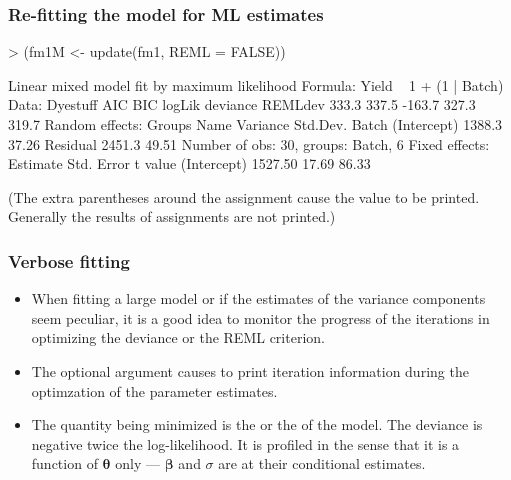 \begin{frame}[fragile]
  \frametitle{Re-fitting the model for ML estimates}
\begin{Schunk}
\begin{Sinput}
> (fm1M <- update(fm1, REML = FALSE))
\end{Sinput}
\begin{Soutput}
Linear mixed model fit by maximum likelihood 
Formula: Yield ~ 1 + (1 | Batch) 
   Data: Dyestuff 
   AIC   BIC logLik deviance REMLdev
 333.3 337.5 -163.7    327.3   319.7
Random effects:
 Groups   Name        Variance Std.Dev.
 Batch    (Intercept) 1388.3   37.26   
 Residual             2451.3   49.51   
Number of obs: 30, groups: Batch, 6
Fixed effects:
            Estimate Std. Error t value
(Intercept)  1527.50      17.69   86.33
\end{Soutput}
\end{Schunk}

(The extra parentheses around the assignment cause the value to
be printed.  Generally the results of assignments are not printed.)

\end{frame}

\begin{frame}
  \frametitle{Verbose fitting}
  \begin{itemize}
  \item When fitting a large model or if the estimates of the variance
    components seem peculiar, it is a good idea to monitor the
    progress of the iterations in optimizing the deviance or the REML
    criterion.
  \item The optional argument  causes 
    to print iteration information during the optimzation of the
    parameter estimates.
  \item The quantity being minimized is the 
    or the  of the model.  The deviance
    is negative twice the log-likelihood.  It is profiled in the sense
    that it is a function of $\bm\theta$ only --- $\bm\beta$ and
    $\sigma$ are at their conditional estimates.
  \end{itemize}
\end{frame}

